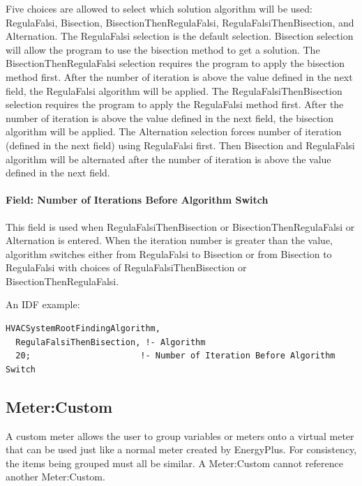 Five choices are allowed to select which solution algorithm will be used: RegulaFalsi, Bisection,  BisectionThenRegulaFalsi, RegulaFalsiThenBisection, and Alternation. The RegulaFalsi
selection is the default selection. Bisection selection will allow the program to use the bisection method to get a solution. The BisectionThenRegulaFalsi selection requires the program to apply the bisection method first. After the number of iteration is above the value defined in the next field, the RegulaFalsi algorithm will be applied. The RegulaFalsiThenBisection selection requires the program to apply the RegulaFalsi method first. After the number of iteration is above the value defined in the next field, the bisection algorithm will be applied. The Alternation selection forces number of iteration (defined in the next field) using RegulaFalsi first. Then Bisection and RegulaFalsi algorithm will be alternated after the number of iteration is above the value defined in the next field.


\paragraph{Field: Number of Iterations Before Algorithm Switch}\label{field-number-of-iteration-before-algorithm-switch}

This field is used when RegulaFalsiThenBisection or BisectionThenRegulaFalsi or Alternation is entered. When the iteration number is greater than the value, algorithm switches either from RegulaFalsi to Bisection or from Bisection to RegulaFalsi with choices of RegulaFalsiThenBisection or BisectionThenRegulaFalsi.

An IDF example:

\begin{lstlisting}
HVACSystemRootFindingAlgorithm,
  RegulaFalsiThenBisection, !- Algorithm
  20;                      !- Number of Iteration Before Algorithm Switch
\end{lstlisting}

\subsection{Meter:Custom}\label{metercustom}

A custom meter allows the user to group variables or meters onto a virtual meter that can be used just like a normal meter created by EnergyPlus. For consistency, the items being grouped must all be similar. A Meter:Custom cannot reference another Meter:Custom.

